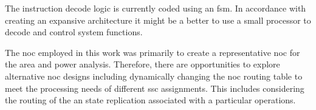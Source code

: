 The instruction decode logic is currently coded using an \ac{fsm}.  In accordance with creating an expansive architecture it might be a better to use a small processor to decode and control system functions.

The \ac{noc} employed in this work was primarily to create a representative \ac{noc} for the area and power analysis.
Therefore, there are opportunities to explore alternative \ac{noc} designs including dynamically changing the \ac{noc} routing table to meet the processing needs of different \ac{ssc} assignments.
This includes considering the routing of the \ac{an} state replication associated with a particular operations.

\iffalse
  \item Half-Precision PE
  \item Additional PE pipelining
  \item Systolic PE
\fi

